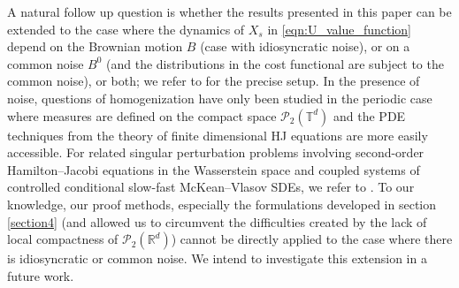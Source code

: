 \documentclass[reqno,11pt]{amsart}
\numberwithin{equation}{section}
\newcommand{\R}{\mathbb{R}} %
\newcommand{\T}{\mathbb{T}}
\newcommand{\nd}{\noindent}
\begin{document}
\nd
A natural follow up question is whether the results presented in this paper can be extended to the case where the dynamics of $X_s$ in \eqref{eqn:U_value_function} depend on the Brownian motion $B$ (case with idiosyncratic noise), or on a common noise $B^0$ (and the distributions in the cost functional are subject to the common noise), or both; we refer to \cite{djete2022mckean1,djete2022mckean} for the precise setup. In the presence of noise, questions of homogenization have only been studied in the periodic case where measures are defined on the compact space $\mathcal{P}_2(\T^d)$ and the PDE techniques from the theory of finite dimensional HJ equations are more easily accessible. For related singular perturbation problems involving second-order Hamilton--Jacobi equations in the Wasserstein space and coupled systems of controlled conditional slow-fast McKean--Vlasov SDEs, we refer to \cite{zitridis2025singular,Zitridis2023}. To our knowledge, our proof methods, especially the formulations developed in section \ref{section4} (and  allowed us to circumvent the difficulties created by the lack of local compactness of $\mathcal{P}_2(\R^d)$) cannot be directly applied to the case where there is idiosyncratic or common noise. We intend to investigate this extension in a future work.





\end{document}
